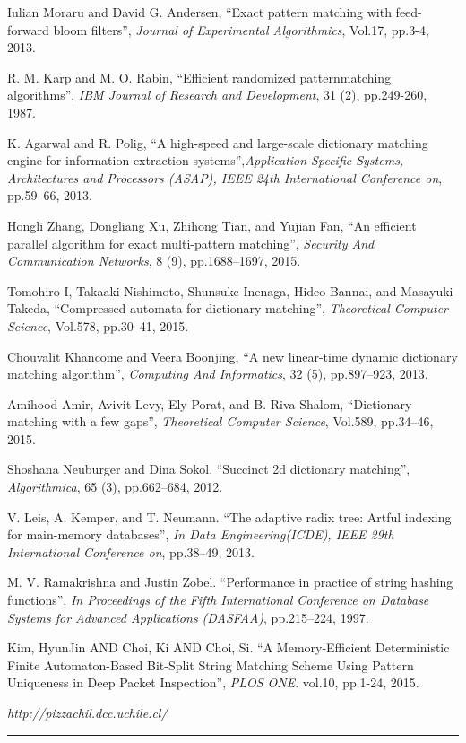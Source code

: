 \documentclass{ws-ijprai}
\begin{document}
\begin{thebibliography}{99}
 Iulian Moraru and David G. Andersen, ``Exact
  pattern matching with feed-forward bloom filters'', {\it Journal of
    Experimental Algorithmics}, Vol.17, pp.3-4, 2013.

 R. M. Karp and M. O. Rabin, ``Efficient randomized
  patternmatching algorithms'', {\it IBM Journal of Research and
    Development}, 31 (2), pp.249-260, 1987.

 K. Agarwal and R. Polig, ``A high-speed and
  large-scale dictionary matching engine for information extraction
  systems'',{\it Application-Specific Systems, Architectures and
    Processors (ASAP), IEEE 24th International Conference on},
  pp.59–66, 2013.

 Hongli Zhang, Dongliang Xu, Zhihong Tian, and
  Yujian Fan, ``An efficient parallel algorithm for exact
  multi-pattern matching'', {\it Security And Communication Networks},
  8 (9), pp.1688–1697, 2015.

 Tomohiro I, Takaaki Nishimoto, Shunsuke Inenaga, Hideo
  Bannai, and Masayuki Takeda, ``Compressed automata for dictionary
  matching'', {\it Theoretical Computer Science}, Vol.578, pp.30–41,
  2015.

 Chouvalit Khancome and Veera Boonjing, ``A new
  linear-time dynamic dictionary matching algorithm'', {\it Computing
    And Informatics}, 32 (5), pp.897–923, 2013.

 Amihood Amir, Avivit Levy, Ely Porat, and B. Riva
  Shalom, ``Dictionary matching with a few gaps'', {\it Theoretical
    Computer Science}, Vol.589, pp.34–46, 2015.

 Shoshana Neuburger and Dina Sokol. ``Succinct
  2d dictionary matching'', {\it Algorithmica}, 65 (3), pp.662–684,
  2012.

 V. Leis, A. Kemper, and T. Neumann. ``The adaptive
  radix tree: Artful indexing for main-memory databases'', {\it In
    Data Engineering(ICDE), IEEE 29th International Conference on},
  pp.38–49, 2013.

 M. V. Ramakrishna and Justin
  Zobel. ``Performance in practice of string hashing functions'', {\it
    In Proceedings of the Fifth International Conference on Database
    Systems for Advanced Applications (DASFAA)}, pp.215–224, 1997.

 Kim, HyunJin AND Choi, Ki AND Choi,
  Si. ``A Memory-Efficient Deterministic Finite Automaton-Based
  Bit-Split String Matching Scheme Using Pattern Uniqueness in Deep
  Packet Inspection'', {\it PLOS ONE}. vol.10, pp.1-24, 2015.

 {\it http://pizzachil.dcc.uchile.cl/}

\end{thebibliography}  


\vspace*{-0.01in}
\noindent
\rule{12.6cm}{.1mm}
\end{document}

